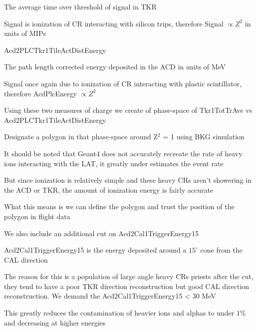 \documentclass{article}
\begin{document}
\begin{myEnumerate}
\begin{myEnumerate}
\begin{myEnumerate}
					\begin{myEnumerate}
						\item The average time over threshold of signal in TKR
						\item Signal is ionization of CR interacting with silicon trips, therefore Signal $\propto Z^2$ in units of MIPs
					\end{myEnumerate}
					\item Acd2PLCTkr1TileActDistEnergy
					\begin{myEnumerate}
						\item The path length corrected energy deposited in the ACD in units of MeV
						\item Signal once again due to ionization of CR interacting with plastic scintillator, therefore AcdPlcEnergy $\propto Z^2$
					\end{myEnumerate}
					\item Using these two measures of charge we create of phase-space of Tkr1TotTrAve vs Acd2PLCTkr1TileActDistEnergy 
					\item Designate a polygon in that phase-space around Z$^2$ = 1 using BKG simulation
					\begin{myEnumerate}
						\item It should be noted that Geant4 does not accurately recreate the rate of heavy ions interacting with the LAT, it greatly under estimates the event rate
						\item But since ionization is relatively simple and these heavy CRs aren't showering in the ACD or TKR, the amount of ionization energy is fairly accurate
						\item What this means is we can define the polygon and trust the position of the polygon in flight data
					\end{myEnumerate}
					\item We also include an additional cut on Acd2Cal1TriggerEnergy15
					\begin{myEnumerate}
						\item Acd2Cal1TriggerEnergy15 is the energy deposited around a $15^{\circ}$ cone from the CAL direction
						\item The reason for this is a population of large angle heavy CRs priests after the cut, they tend to have a poor TKR direction reconstruction but good CAL direction reconstruction.  We demand the Acd2Cal1TriggerEnergy15 < 30 MeV
					\end{myEnumerate}
					\item This greatly reduces the contamination of heavier ions and alphas to under $1\%$ and decreasing at higher energies

\end{myEnumerate}
\end{myEnumerate}
\end{myEnumerate}
\end{document}
